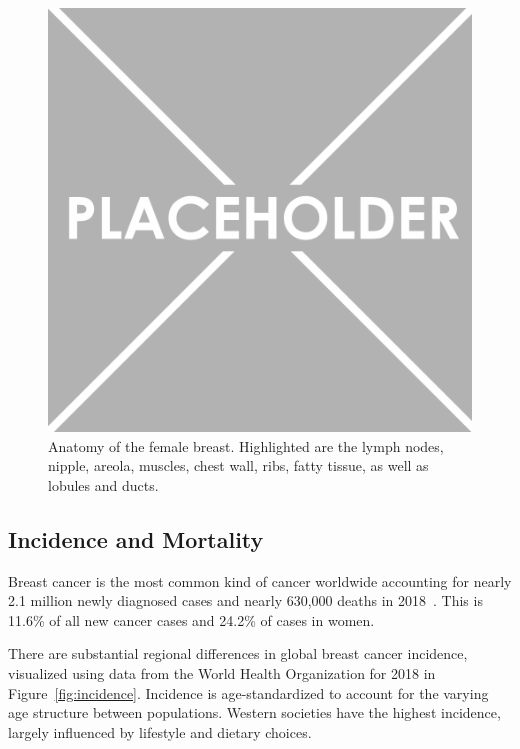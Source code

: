 \documentclass[11pt]{book}
\begin{document}
\begin{figure}[t]
\centering
\includegraphics[width=\textwidth]{img/placeholder.png}
\caption[Anatomy of the Female Breast]{Anatomy of the female breast. Highlighted are the lymph nodes, nipple, areola, muscles, chest wall, ribs, fatty tissue, as well as lobules and ducts.}
\label{fig:breast-anatomy}
\end{figure}


\subsection{Incidence and Mortality}
\label{subsec:incidence}

Breast cancer is the most common kind of cancer worldwide accounting for nearly 2.1 million newly diagnosed cases and nearly 630,000 deaths in 2018~\cite{Bray:2018}. This is 11.6\% of all new cancer cases and 24.2\% of cases in women.

There are substantial regional differences in global breast cancer incidence, visualized using data from the World Health Organization for 2018 in Figure~\ref{fig:incidence}. Incidence is age-standardized to account for the varying age structure between populations. Western societies have the highest incidence, largely influenced by lifestyle and dietary choices.
\end{document}
